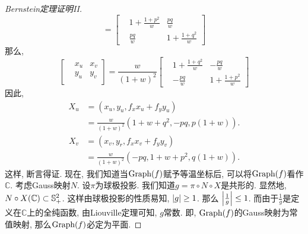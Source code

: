 \begin{proof}[Bernstein定理证明II]
\begin{equation}
        =
        \begin{bmatrix}
            &1+\frac{1+p^2}{w} & \frac{pq}{w} \\
            &\frac{pq}{w} & 1+\frac{1+q^2}{w}
        \end{bmatrix}
    \end{equation}
    那么, 
    \begin{equation}
        \begin{bmatrix}
            &x_u &x_v \\
            &y_u &y_v\\
        \end{bmatrix}
        =
        \frac{w}{(1+w)^2} 
        \begin{bmatrix}
            &1+\frac{1+q^2}{w} & -\frac{pq}{w} \\
            &-\frac{pq}{w} & 1+\frac{1+p^2}{w}
        \end{bmatrix}
    \end{equation}
    因此, 
    \begin{equation}
        \begin{split}
            X_u &=(x_u,y_u, f_xx_u+f_yy_u) \\
            &=\frac{w}{(1+w)^2}(1+w+q^2, -pq, p(1+w)).
        \end{split}
    \end{equation}
    \begin{equation}
        \begin{split}
            X_v &=(x_v,y_r, f_xx_v+f_yy_v) \\
            &=\frac{w}{(1+w)^2}(-pq, 1+w+p^2, q(1+w)).
        \end{split}
    \end{equation}
    这样, 断言得证. 现在, 我们知道当$\G(f)$赋予等温坐标后, 可以将$\G(f)$看作$\mathbb{C}$. 考虑Gauss映射$N$.  设$\pi$为球极投影. 我们知道$g=\pi\circ N \circ X$是共形的. 显然地, $N\circ X(\mathbb{C}) \subset \S^2_+$. 这样由球极投影的性质易知, $\abs{g} \ge 1$. 那么 $\abs{\frac{1}{g}} \le 1$. 而由于$\frac{1}{g}$是定义在$\mathbb{C}$上的全纯函数, 由Liouville定理可知, $g$常数. 即, $\G(f)$的Gauss映射为常值映射, 那么$\G(f)$必定为平面.
\end{proof}
